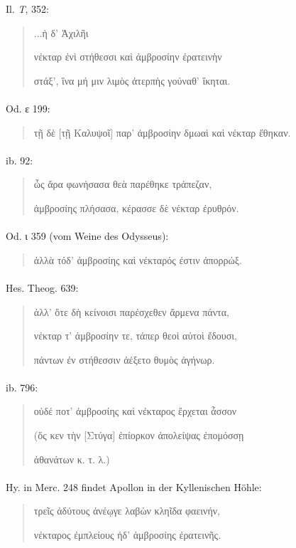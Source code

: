 \documentclass[a4paper, 11pt, oneside]{article}
\begin{document}
Il. \emph{T}, 352:
\begin{quotation}
...ἡ δ' Ἀχιλῆι

νέκταρ ἐνὶ στήθεσσι καὶ ἀμβροσίην ἐρατεινὴν

στάξ', ἵνα μή μιν λιμὸς ἀτερπὴς γούναθ' ἴκηται.
\end{quotation}
\paragraph{}
Od. ε 199:
\begin{quotation}
τῇ δὲ [τῇ Καλυψοῖ] παρ' ἀμβροσίην δμωαὶ καὶ νέκταρ ἔθηκαν.
\end{quotation}
\paragraph{}
ib. 92:
\begin{quotation}
ὧς ἄρα φωνήσασα θεὰ παρέθηκε τράπεζαν,

ἀμβροσίης πλήσασα, κέρασσε δὲ νέκταρ ἐρυθρόν.
\end{quotation}
\paragraph{}
Od. ι 359 (vom Weine des Odysseus):
\begin{quotation}
ἀλλὰ τόδ' ἀμβροσίης καὶ νέκταρός ἐστιν ἀπορρώξ.
\end{quotation}
\paragraph{}
Hes. Theog. 639:
\begin{quotation}
ἀλλ' ὅτε δὴ κείνοισι παρέσχεθεν ἄρμενα πάντα,

νέκταρ τ' ἀμβροσίην τε, τάπερ θεοὶ αὐτοὶ ἔδουσι,

πάντων ἐν στήθεσσιν ἀέξετο θυμὸς ἀγήνωρ.
\end{quotation}
\paragraph{}
ib. 796:
\begin{quotation}
οὐδέ ποτ' ἀμβροσίης καὶ νέκταρος ἔρχεται ἆσσον

(ὅς κεν τὴν [Στύγα] ἐπίορκον ἀπολείψας ἐπομόσσῃ

ἀθανάτων κ. τ. λ.)
\end{quotation}
\paragraph{}
Hy. in Merc. 248 findet Apollon in der Kyllenischen Höhle:
\begin{quotation}
τρεῖς ἀδύτους ἀνέῳγε λαβὼν κληῖδα φαεινήν,

νέκταρος ἐμπλείους ἠδ' ἀμβροσίης ἐρατεινῆς.
\end{quotation}
\end{document}
